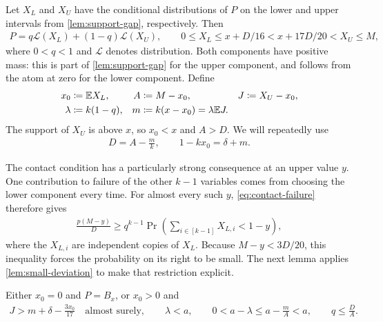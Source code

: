 Let $X_L$ and $X_U$ have the conditional distributions of $P$ on the lower and upper intervals from \cref{lem:support-gap}, respectively.
Then
\begin{align}
 P=q\mathcal L(X_L)+(1-q)\mathcal L(X_U),\qquad
 0\le X_L\le x+D/16<x+17D/20<X_U\le M,
 \label{eq:two-components}
\end{align}
where $0<q<1$ and $\mathcal L$ denotes distribution.
Both components have positive mass: this is part of \cref{lem:support-gap} for the upper component, and follows from the atom at zero for the lower component.
Define
\begin{align}
 x_0&\coloneqq\mathbb E X_L,
 &A&\coloneqq M-x_0,
 &J&\coloneqq X_U-x_0,\notag\\
 \lambda&\coloneqq k(1-q),
 &m&\coloneqq k(x-x_0)=\lambda\mathbb E J.
 \label{eq:mixture-parameters}
\end{align}
The support of $X_U$ is above $x$, so $x_0<x$ and $A>D$.
We will repeatedly use
\begin{align}
 D=A-\frac mk,
 \qquad 1-kx_0=\delta+m.
 \label{eq:mixture-identities}
\end{align}

The contact condition has a particularly strong consequence at an upper value $y$.
One contribution to failure of the other $k-1$ variables comes from choosing the lower component every time.
For almost every such $y$, \cref{eq:contact-failure} therefore gives
\begin{align}
 \frac{p(M-y)}D
 \ge q^{k-1}\Pr\left(\sum_{i\in[k-1]}X_{L,i}<1-y\right),
 \label{eq:upper-contact-lower-failure}
\end{align}
where the $X_{L,i}$ are independent copies of $X_L$.
Because $M-y<3D/20$, this inequality forces the probability on its right to be small.
The next lemma applies \cref{lem:small-deviation} to make that restriction explicit.

\begin{lemma}\label{lem:upper-component}
Either $x_0=0$ and $P=B_x$, or $x_0>0$ and
\begin{align}
 J>m+\delta-\frac{3x_0}{17}\quad\text{almost surely},
 \qquad \lambda<a,
 \qquad 0<a-\lambda\le a-\frac mA<a,
 \qquad q\le\frac DA.
 \label{eq:upper-component-bounds}
\end{align}
\end{lemma}

